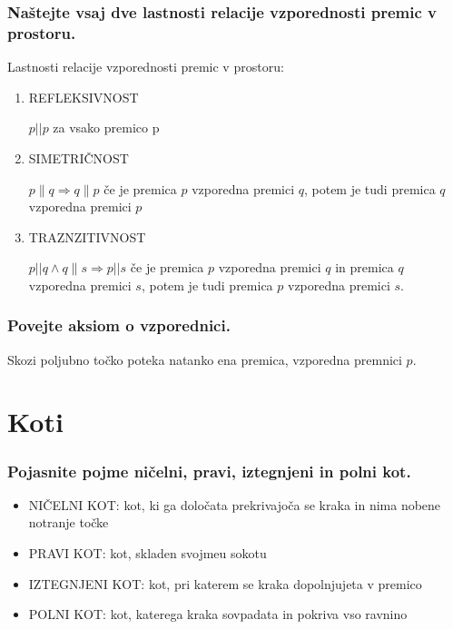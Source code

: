 \documentclass{article}
\begin{document}
\subsubsection*{Naštejte vsaj dve lastnosti relacije vzporednosti premic v prostoru.}

Lastnosti relacije vzporednosti premic v prostoru:

\begin{enumerate}
    \item REFLEKSIVNOST

    $p || p$ za vsako premico $\mathrm{p}$

    \item SIMETRIČNOST

    $p\|q \Rightarrow q\| p$ če je premica $p$ vzporedna premici $q$, potem je tudi premica $q$ vzporedna premici $p$

    \item TRAZNZITIVNOST

    $p|| q \wedge q \| s \Rightarrow p|| s$ če je premica $p$ vzporedna premici $q$ in premica $q$ vzporedna premici $s$, potem je tudi premica $p$ vzporedna premici $s$.
\end{enumerate}

\subsubsection*{Povejte aksiom o vzporednici.}

Skozi poljubno točko poteka natanko ena premica, vzporedna premnici $p$.


\section{Koti}

\subsubsection*{Pojasnite pojme ničelni, pravi, iztegnjeni in polni kot.}
\begin{itemize}
    \item NIČELNI KOT: kot, ki ga določata prekrivajoča se kraka in nima nobene notranje točke
    \item PRAVI KOT: kot, skladen svojmeu sokotu
    \item IZTEGNJENI KOT: kot, pri katerem se kraka dopolnjujeta v premico
    \item POLNI KOT: kot, katerega kraka sovpadata in pokriva vso ravnino
\end{itemize}
 
\end{document}
